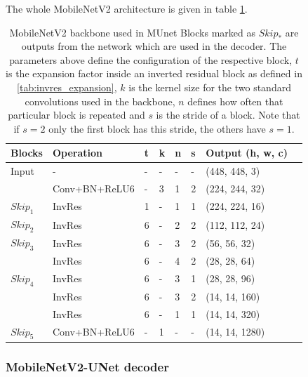 The whole MobileNetV2 architecture is given in table \ref{tab:mobilenetv2_architecture}.

\begin{table} %
\begin{center}

\begin{tabular}{l|l|l|l|l|l|l|l}
\textbf{Blocks} & \textbf{Operation} & \textbf{t} & \textbf{k} & \textbf{n} & \textbf{s} & \textbf{Output (h, w, c)}\\
\hline
Input           & -             & - & - & - & - & (448, 448, 3) \\
                & Conv+BN+ReLU6 & - & 3 & 1 & 2 & (224, 244, 32) \\
$Skip_{1}$      & InvRes        & 1 & - & 1 & 1 & (224, 224, 16)\\
$Skip_{2}$      & InvRes        & 6 & - & 2 & 2 & (112, 112, 24) \\
$Skip_{3}$      & InvRes        & 6 & - & 3 & 2 & (56, 56, 32) \\
                & InvRes        & 6 & - & 4 & 2 & (28, 28, 64) \\
$Skip_{4}$      & InvRes        & 6 & - & 3 & 1 & (28, 28, 96) \\
                & InvRes        & 6 & - & 3 & 2 & (14, 14, 160) \\
                & InvRes        & 6 & - & 1 & 1 & (14, 14, 320) \\
$Skip_{5}$      & Conv+BN+ReLU6 & - & 1 & - & - & (14, 14, 1280) \\
\end{tabular}

\caption{MobileNetV2 backbone used in \ac{MUnet} Blocks marked as $Skip_*$ are outputs from the network which are used in the decoder. The parameters above define the configuration of the respective block, $t$ is the expansion factor inside an inverted residual block as defined in \ref{tab:invres_expansion}, $k$ is the kernel size for the two standard convolutions used in the backbone, $n$ defines how often that particular block is repeated and $s$ is the stride of a block. Note that if $s = 2$ only the first block has this stride, the others have $s = 1$.}
\label{tab:mobilenetv2_architecture}
\end{center}
\end{table}

\subsubsection{MobileNetV2-UNet decoder}

